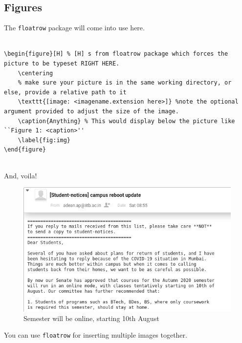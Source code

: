 \documentclass{article}
\theoremstyle{remark}
\begin{document}
    \subsection{Figures}
    The \verb!floatrow! package will come into use here.
\begin{lstlisting}

\begin{figure}[H] % [H] s from floatrow package which forces the picture to be typeset RIGHT HERE.
    \centering
    % make sure your picture is in the same working directory, or else, provide a relative path to it
    \texttt{[image: <imagename.extension here>]} %note the optional argument provided to adjust the size of the image.
    \caption{Anything} % This would display below the picture like ``Figure 1: <caption>''
    \label{fig:img}
\end{figure}
    
\end{lstlisting}

\clearpage
    And, voila! 
    \begin{figure}[H]
        \centering
        \includegraphics[width=0.6\linewidth]{Proof_of_online_semester.png} 
        \caption{Semester will be online, starting 10th August}
        \label{fig:img}
    \end{figure}

You can use \verb!floatrow! for inserting multiple images together.
\end{document}
